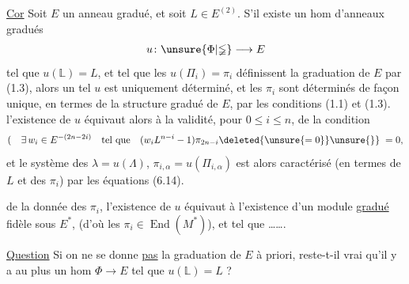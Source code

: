 \uline{Cor} Soit $E$ un anneau gradué,  et soit $L\in E^{(2)}$. S'il existe un hom d'anneaux gradués
\[
u\colon \unsure{\Phi|\mathbb{\Phi}}\longrightarrow E
\]
tel que $u(\mathbb L)=L$, et tel que les $u(\Pi_i)=\pi_i$ définissent la graduation de $E$ par (1.3), alors un tel $u$ est uniquement déterminé, et les $\pi_i$ sont déterminés de façon unique, en termes de la structure  gradué de $E$, par les conditions (1.1) et (1.3).   l'existence de $u$ équivaut alors à  la validité, pour  $0\leq i\leq n$, de la condition
\[
(\quad\exists\,w_i\in E^{-(2n-2i)}\quad\text{tel que}\quad (w_i L^{n-i}-1)\pi_{2n-i}\deleted{\unsure{=0}}\unsure{\}}\;=0,
\]
et  le système des $\lambda=u(\Lambda)$,  $\pi_{i,\alpha}=u(\Pi_{i,\alpha})$ est alors caractérisé (en termes de $L$ et des $\pi_i$) par les équations (6.14).  

 de la donnée des $\pi_i$, l'existence de $u$ équivaut à l'existence d'un module \uline{gradué} fidèle sous $E^*$,   (d'où les $\pi_i\in\operatorname{End}(M^*)$), et tel que \ldots\ldots .

\uline{Question} Si on ne se donne \uline{pas} la graduation de $E$ à priori,  reste-t-il vrai qu'il y a au plus un hom $\Phi\to E$ tel que $u(\mathbb L)=L$ ?

